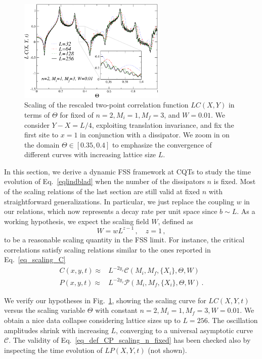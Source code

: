 \begin{figure}
    \centering
    \includegraphics[width=7cm]{imm/fssnfixed2n.pdf}
    \caption{Scaling of the rescaled two-point correlation function $L C(X, Y)$ in terms of $\Theta$ for fixed of $n=2, M_i=1, M_f=3$, and $W=0.01$. We consider $Y-X=L/4$, exploiting translation invariance, and fix the first site to $x=1$ in conjunction with a dissipator. We zoom in on the domain $\Theta\in[0.35, 0.4]$ to emphasize the convergence of different curves with increasing lattice size $L$.}
    \label{fig_fss_2n_fixed}
\end{figure}

In this section, we derive a dynamic FSS framework at CQTs to study the time evolution of Eq.~\eqref{eqlindblad} when the number of the dissipators $n$ is fixed. Most of the scaling relations of the last section are still valid at fixed $n$ with straightforward generalizations. In particular, we just replace the coupling $w$ in our relations, which now represents a decay rate per unit space since $b\sim L$. As a working hypothesis, we expect the scaling field $W$, defined as
\begin{equation}
    W = w L^{z-1}\,, \quad z=1\,,
    \label{eq_def_scaling_variable_W}
\end{equation}
to be a reasonable scaling quantity in the FSS limit. 
For instance, the critical correlations satisfy scaling relations similar to the ones reported in Eq.~\eqref{eq_scaling_C}
\begin{align}
    C(x, y, t)\approx& L^{-2y_c}\mathcal{C}(M_i, M_f, \{X_i\}, \Theta, W)\\
    P(x, y, t)\approx& L^{-2y_c}\mathcal{P}
    (M_i, M_f, \{X_i\}, \Theta, W)\,.
    \label{eq_def_CP_scaling_n_fixed}
\end{align}

We verify our hypotheses in Fig.~\ref{fig_fss_2n_fixed}, showing the scaling curve for $L C(X, Y, t)$ versus the scaling variable $\Theta$ with constant $n=2, M_i=1, M_f=3, W=0.01$. We obtain a nice data collapse considering lattice sizes up to $L=256$. The oscillation amplitudes shrink with increasing $L$, converging to a universal asymptotic curve $\mathcal{C}$. The validity of Eq.~\eqref{eq_def_CP_scaling_n_fixed} has been checked also by inspecting the time evolution of $L P(X, Y, t)$ (not shown).



